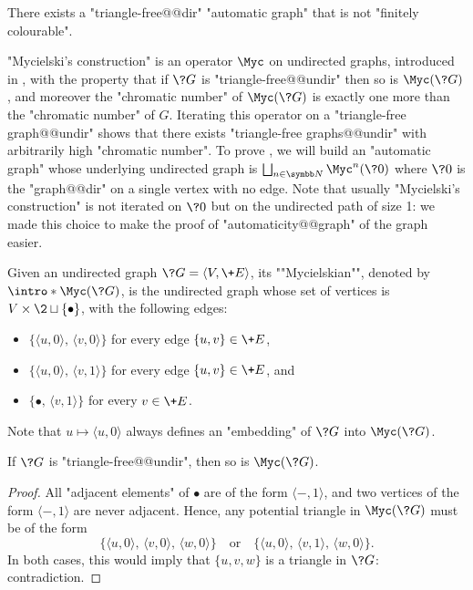 \begin{proposition}
	\AP\label{prop:automatic-graph-not-fin-colourable}
	There exists a "triangle-free@@dir" "automatic graph" that is not "finitely colourable".
\end{proposition}

"Mycielski's construction" is an operator $\Myc$ on undirected graphs,
introduced in \cite{Mycielski55Coloriage}, with the property that if $\?G$ is "triangle-free@@undir"
then so is $\Myc(\?G)$, and moreover
the "chromatic number" of $\Myc(\?G)$ is exactly one more than the "chromatic number" of $G$.
Iterating this operator on a "triangle-free graph@@undir" shows that there exists
"triangle-free graphs@@undir" with arbitrarily high "chromatic number".
To prove , we will build
an "automatic graph" whose underlying undirected graph is
$\bigdcup_{n\in\N} \Myc^n(\?0)$ where $\?0$ is the "graph@@dir" on a single vertex with no edge.
Note that usually "Mycielski's construction" is not iterated on $\?0$ but on the undirected
path of size 1: we made this choice to make the proof of "automaticity@@graph" of the graph
easier.

\begin{definition}
	Given an undirected graph $\?G = \langle V, \+E \rangle$, its \AP""Mycielskian"",
	denoted by \AP$\intro*\Myc(\?G)$, is the undirected graph whose set of vertices is
	$V\times\2 \dcup \set{\bullet}$, with the following edges:
	\begin{itemize}
		\item $\{\langle u, 0 \rangle,\, \langle v, 0 \rangle\}$
			for every edge $\{ u,v \} \in \+E$,
		\item $\{\langle u, 0 \rangle,\, \langle v, 1 \rangle\}$
			for every edge $\{ u,v \} \in \+E$, and
		\item $\{ \bullet,\, \langle v, 1 \rangle\}$
			for every $v \in \+E$.
	\end{itemize}
\end{definition}

Note that $u \mapsto \langle u,0\rangle$ always defines an "embedding" of
$\?G$ into $\Myc(\?G)$.

\begin{property}
	\label{prop:triangle-free}
	If $\?G$ is "triangle-free@@undir", then so is $\Myc(\?G)$.
\end{property}

\begin{proof}
	All "adjacent elements" of $\bullet$ are of the form $\langle -, 1\rangle$,
	and two vertices of the form $\langle -, 1\rangle$ are never adjacent.
	Hence, any potential triangle in $\Myc(\?G)$ must be of the form
	\[
	\{
		\langle u, 0 \rangle,\,
		\langle v, 0 \rangle,\,
		\langle w, 0 \rangle
	\}
	\quad\text{or}\quad
	\{
		\langle u, 0 \rangle,\,
		\langle v, 1 \rangle,\,
		\langle w, 0 \rangle
	\}.
	\]
	In both cases, this would imply that $\{u,v,w\}$ is a triangle in $\?G$:
	contradiction.
\end{proof}

